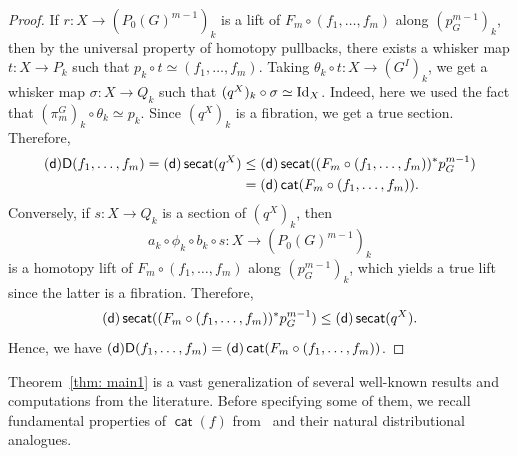 \documentclass[amscd,amssymb,verbatim,10pt]{amsart}
\numberwithin{equation}{section}
\theoremstyle{plain}
\theoremstyle{definition}
\DeclareMathOperator{\cat}{{\mathsf{cat}}}
\DeclareMathOperator{\secat}{{\mathsf{secat}}}
\def\id{\protect\operatorname{Id}}
\newcommand{\D}{{\sf {D}}}
\newcommand{\sd}{{(\sf {d})}}
\begin{document}
\begin{proof}
If $r\colon X\to (P_0(G)^{m-1})_k$ is a lift of $F_m\circ (f_1,\dots,f_m)$ along $(p_G^{m-1})_k$, then by the universal property of homotopy pullbacks, there exists a whisker map $t\colon X\to P_k$ such that $p_k\circ t\simeq (f_1,\dots,f_m)$. Taking $\theta_k\circ t\colon X\to (G^I)_k$, we get a whisker map $\sigma\colon X\to Q_k$ such that $(q^X)_k\circ\sigma\simeq\id_X$. Indeed, here we used the fact that $(\pi^G_m)_k\circ\theta_k\simeq p_k$. Since $(q^X)_k$ is a fibration, we get a true section. Therefore, 
\begin{align*}
\sd\D(f_1,\dots,f_m)=\sd\secat(q^X) & \le \sd\secat((F_m\circ (f_1,\dots,f_m))^*p_G^{m-1})
\\
& =\sd\cat(F_m\circ (f_1,\dots,f_m)).
\end{align*}
Conversely, if $s\colon X\to Q_k$ is a section of $(q^X)_k$, then 
\[
a_k\circ \phi_k\circ b_k\circ s\colon X \to (P_0(G)^{m-1})_k
\]
is a homotopy lift of $F_m\circ (f_1,\dots,f_m)$ along $(p_G^{m-1})_k$, which yields a true lift since the latter is a fibration. Therefore, 
\[
\sd\secat((F_m\circ (f_1,\dots,f_m))^*p_G^{m-1})\le \sd\secat(q^X).
\]
Hence, we have $\sd\D(f_1,\dots,f_m)=\sd\cat(F_m\circ (f_1,\dots,f_m))$.
\end{proof}


Theorem~\ref{thm: main1} is a vast generalization of several well-known results and computations from the literature. Before specifying some of them, we recall fundamental properties of $\cat(f)$ from~\cite{CLOT} and their natural distributional analogues.
\end{document}
